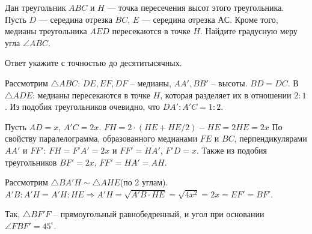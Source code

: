 
Дан треугольник $ABC$ и $H$ — точка пересечения высот этого треугольника. 
Пусть $D$ — середина отрезка $BC$, $E$ — середина отрезка $АС$. 
Кроме того, медианы треугольника $AED$ пересекаются в точке $H$. Найдите градусную меру угла $\angle ABC$. 

Ответ укажите с точностью до десятитысячных.

\solutionSection


Рассмотрим $\triangle ABC$: $DE, EF, DF$ -- медианы, $AA', BB'$ -- высоты. $BD = DC$. В $\triangle ADE$: медианы пересекаются в точке $H$, которая разделяет их в отношении $2:1$. Из подобия треугольников очевидно, что $DA':A'C = 1:2$. 

Пусть $AD = x$, $A'C = 2x$. $FH = 2 \cdot (HE + HE/2) - HE = 2HE = 2x$ По свойству паралелограмма, образованного медианами $FE$ и $BC$, перпендикулярами $AA'$ и $FF'$: $FH = F'A' = 2x$ и $FF'=HA'$, $F'D = x$. Также из подобия треугольников $BF' = 2x$, $FF'=HA'=AH$. 

Рассмотрим $\triangle BA'H\sim\triangle AHE$(по 2 углам). $A'B:A'H=A'H:HE \Rightarrow A'H = \sqrt{A'B\cdot HE} = \sqrt{4x^2} = 2x = EF'=BF'$. 

Так, $\triangle BF'F$ -- прямоугольный равнобедренный, и угол при основании $\angle FBF' = 45^\circ$.\\

